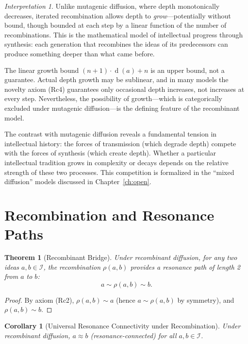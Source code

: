 \documentclass[11pt,openany]{book}
\theoremstyle{definition}
\theoremstyle{plain}
\newtheorem{theorem}[axiom]{Theorem}
\newtheorem{corollary}[axiom]{Corollary}
\theoremstyle{remark}
\newtheorem{interpretation}[axiom]{Interpretation}
\newcommand{\IS}{\mathcal{I}}               %
\newcommand{\res}{\sim}                      %
\newcommand{\depth}{\operatorname{d}}       %
\begin{document}
\begin{interpretation}
Unlike mutagenic diffusion, where depth monotonically decreases, iterated recombination allows depth to \emph{grow}---potentially without bound, though bounded at each step by a linear function of the number of recombinations. This is the mathematical model of intellectual progress through synthesis: each generation that recombines the ideas of its predecessors can produce something deeper than what came before.

The linear growth bound $(n+1) \cdot \depth(a) + n$ is an upper bound, not a guarantee. Actual depth growth may be sublinear, and in many models the novelty axiom (Rc4) guarantees only occasional depth increases, not increases at every step. Nevertheless, the possibility of growth---which is categorically excluded under mutagenic diffusion---is the defining feature of the recombinant model.

The contrast with mutagenic diffusion reveals a fundamental tension in intellectual history: the forces of transmission (which degrade depth) compete with the forces of synthesis (which create depth). Whether a particular intellectual tradition grows in complexity or decays depends on the relative strength of these two processes. This competition is formalized in the ``mixed diffusion'' models discussed in Chapter~\ref{ch:open}.
\end{interpretation}

\section{Recombination and Resonance Paths}

\begin{theorem}[Recombinant Bridge]
Under recombinant diffusion, for any two ideas $a, b \in \IS$, the recombination $\rho(a, b)$ provides a resonance path of length 2 from $a$ to $b$:
\[
a \res \rho(a, b) \res b.
\]
\end{theorem}

\begin{proof}
By axiom (Rc2), $\rho(a, b) \res a$ (hence $a \res \rho(a, b)$ by symmetry), and $\rho(a, b) \res b$.
\end{proof}

\begin{corollary}[Universal Resonance Connectivity under Recombination]
Under recombinant diffusion, $a \approx b$ (resonance-connected) for all $a, b \in \IS$.
\end{corollary}
\end{document}
